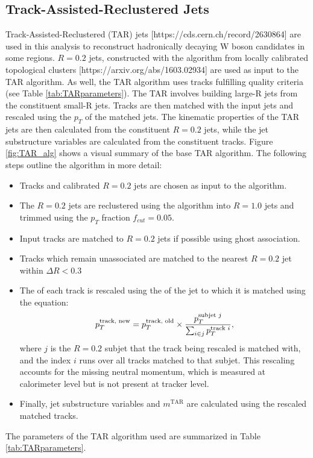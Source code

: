 \subsection{Track-Assisted-Reclustered Jets}
\label{ap:TARjet_object_defs}
Track-Assisted-Reclustered (TAR) jets [https://cds.cern.ch/record/2630864] are used in this analysis to reconstruct hadronically decaying W boson candidates in some regions. $R=0.2$ jets, constructed with the \akt algorithm from locally calibrated topological clusters [https://arxiv.org/abs/1603.02934] are used as input to the TAR algorithm. As well, the TAR algorithm uses tracks fulfilling quality criteria (see Table \ref{tab:TARparameters}). The TAR involves building large-R jets from the constituent small-R jets. Tracks are then matched with the input jets and rescaled using the $p_T$ of the matched jets. The kinematic properties of the TAR jets are then calculated from the constituent $R=0.2$ jets, while the jet substructure variables are calculated from the constituent tracks. Figure \ref{fig:TAR_alg} shows a visual summary of the base TAR algorithm.
The following steps outline the algorithm in more detail:
\begin{itemize}
  \item Tracks and calibrated \akt $R=0.2$ jets are chosen as input to the algorithm.
  \item The \akt $R=0.2$ jets are reclustered using the \akt algorithm into $R=1.0$ jets and trimmed using the $p_T$ fraction \(f_{cut}=0.05\).
  \item Input tracks are matched to $R=0.2$ jets if possible using ghost association.
  \item Tracks which remain unassociated are matched to the nearest \akt $R=0.2$ jet within $\Delta R<0.3$
  \item The \pT of each track is rescaled using the \pT of the jet to which it is matched using the equation:
  \begin{equation}
  p_T^{\text{track, new}} = p_T^{\text{track, old}}\times \frac{p_T^{\text{subjet $j$}}}{\sum_{i \in j} p_T^{\text{track $i$}}} ,
  \label{eq:TAR_rescale}
  \end{equation}  where $j$ is the $R=0.2$ subjet that the track being rescaled is matched with, and the index $i$ runs over all tracks matched to that subjet. This rescaling accounts for the missing neutral momentum, which is measured at calorimeter level but is not present at tracker level.
  \item Finally, jet substructure variables and $m^\text{TAR}$ are calculated using the rescaled matched tracks.
\end{itemize}
The parameters of the TAR algorithm used are summarized in Table \ref{tab:TARparameters}. \\

